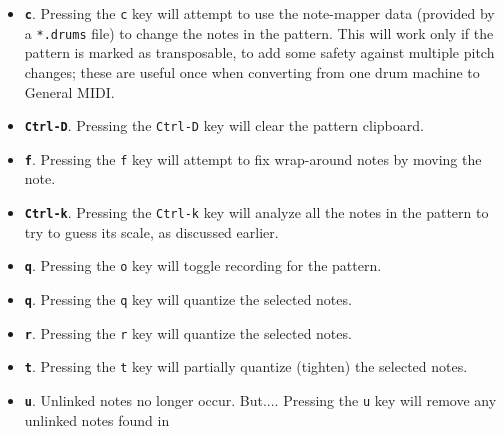    \begin{itemize}
      \item
         \textbf{\texttt{c}}.
         Pressing the \texttt{c} key will attempt to use the note-mapper data
         (provided by a \texttt{*.drums} file) to change the notes in the
         pattern.  This will work only if the pattern is marked as transposable,
         to add some safety against multiple pitch changes; these are useful once
         when converting from one drum machine to General MIDI.
      \item
         \textbf{\texttt{Ctrl-D}}.
         Pressing the \texttt{Ctrl-D} key will clear the pattern clipboard.
      \item
         \textbf{\texttt{f}}.
         Pressing the \texttt{f} key will attempt to fix wrap-around notes by
         moving the note.
      \item
         \textbf{\texttt{Ctrl-k}}.
         Pressing the \texttt{Ctrl-k} key will analyze all the notes in the
         pattern to try to guess its scale, as discussed earlier.
      \item
         \textbf{\texttt{q}}.
         Pressing the \texttt{o} key will toggle recording for the pattern.
      \item
         \textbf{\texttt{q}}.
         Pressing the \texttt{q} key will quantize the selected notes.
      \item
         \textbf{\texttt{r}}.
         Pressing the \texttt{r} key will quantize the selected notes.
      \item
         \textbf{\texttt{t}}.
         Pressing the \texttt{t} key will partially quantize (tighten)
         the selected notes.
      \item
         \textbf{\texttt{u}}.
         Unlinked notes no longer occur.  But....
         Pressing the \texttt{u} key will remove any unlinked notes found in

\end{itemize}
